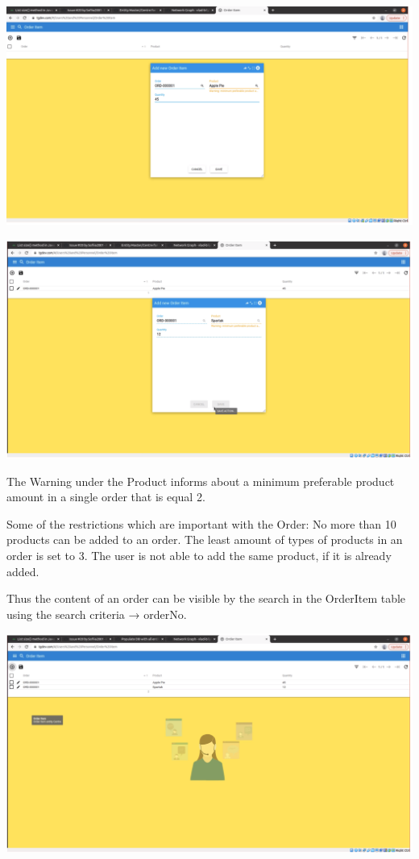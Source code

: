 \includegraphics[width=\textwidth]{sections/01-chapter/images/orderitem3.png}

\includegraphics[width=\textwidth]{sections/01-chapter/images/orderitem4.png}

The Warning under the Product informs about a minimum preferable product amount in a single order that is equal 2. 

Some of the restrictions which are important with the Order:
No more than 10 products can be added to an order. The least amount of types of products in an order is set to 3. The user is not able to add the same product, if it is already added.

Thus the content of an order can be visible by the search in the OrderItem table using the search criteria → orderNo.

\includegraphics[width=\textwidth]{sections/01-chapter/images/orderitem5.png}

